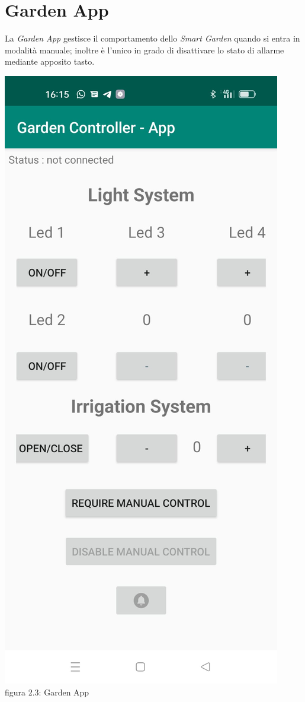 \documentclass[a4paper,12pt]{report}
\begin{document}
\section{Garden App}
La \textit{Garden App} gestisce il comportamento dello \textit{Smart Garden} quando si entra in modalità manuale; inoltre è l'unico in grado di disattivare lo stato di allarme mediante apposito tasto.
\begin{center}
	\includegraphics[scale = 0.2]{app}
	\\figura 2.3: Garden App
\end{center}
\end{document}
